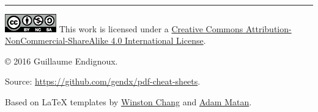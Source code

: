 \documentclass[10pt,landscape,a4paper]{article}
\begin{document}
\begin{multicols}{3}

\begin{center}
\rule{0.3\linewidth}{0.25pt}
\end{center}


\includegraphics[width=6em]{figures/by_nc_sa.eps}
This work is licensed under a \href{http://creativecommons.org/licenses/by-nc-sa/4.0/}{Creative Commons Attribution-NonCommercial-ShareAlike 4.0 International License}.

\copyright{} 2016 Guillaume Endignoux.

Source: \url{https://github.com/gendx/pdf-cheat-sheets}.

Based on \LaTeX{} templates by \href{http://www.stdout.org/~winston/latex/}{Winston Chang} and \href{https://github.com/adamatan/Cheat-Sheets}{Adam Matan}.

\end{multicols}
\end{document}
